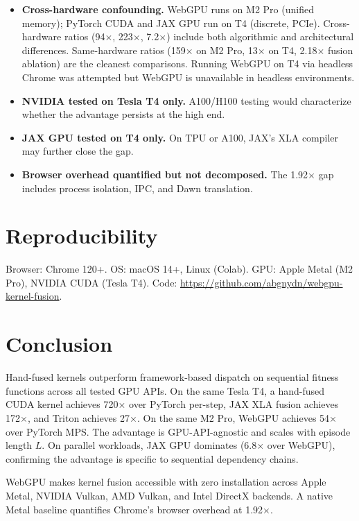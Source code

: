\documentclass[sigconf,nonacm]{acmart}
\begin{document}
\begin{itemize}
  \item \textbf{Cross-hardware confounding.} WebGPU runs on M2 Pro (unified memory); PyTorch CUDA and JAX GPU run on T4 (discrete, PCIe). Cross-hardware ratios (94$\times$, 223$\times$, 7.2$\times$) include both algorithmic and architectural differences. Same-hardware ratios (159$\times$ on M2 Pro, 13$\times$ on T4, 2.18$\times$ fusion ablation) are the cleanest comparisons. Running WebGPU on T4 via headless Chrome was attempted but WebGPU is unavailable in headless environments.
  \item \textbf{NVIDIA tested on Tesla T4 only.} A100/H100 testing would characterize whether the advantage persists at the high end.
  \item \textbf{JAX GPU tested on T4 only.} On TPU or A100, JAX's XLA compiler may further close the gap.
  \item \textbf{Browser overhead quantified but not decomposed.} The 1.92$\times$ gap includes process isolation, IPC, and Dawn translation.
\end{itemize}

\section{Reproducibility}

Browser: Chrome 120+. OS: macOS 14+, Linux (Colab). GPU: Apple Metal (M2 Pro), NVIDIA CUDA (Tesla T4). Code: \url{https://github.com/abgnydn/webgpu-kernel-fusion}.

\section{Conclusion}

Hand-fused kernels outperform framework-based dispatch on sequential fitness functions across all tested GPU APIs. On the same Tesla T4, a hand-fused CUDA kernel achieves 720$\times$ over PyTorch per-step, JAX XLA fusion achieves 172$\times$, and Triton achieves 27$\times$. On the same M2 Pro, WebGPU achieves 54$\times$ over PyTorch MPS. The advantage is GPU-API-agnostic and scales with episode length $L$. On parallel workloads, JAX GPU dominates (6.8$\times$ over WebGPU), confirming the advantage is specific to sequential dependency chains.

WebGPU makes kernel fusion accessible with zero installation across Apple Metal, NVIDIA Vulkan, AMD Vulkan, and Intel DirectX backends. A native Metal baseline quantifies Chrome's browser overhead at 1.92$\times$.
\end{document}
